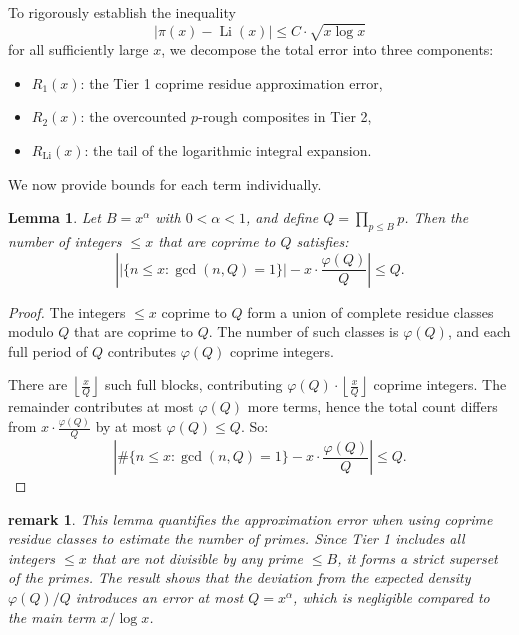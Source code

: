 \documentclass[11pt]{article}
\newtheorem{lemma}{Lemma}
\newtheorem{remark}{remark}
\begin{document}
	To rigorously establish the inequality
	\[
	\left| \pi(x) - \operatorname{Li}(x) \right| \leq C \cdot \sqrt{x \log x}
	\]
	for all sufficiently large \( x \), we decompose the total error into three components:
	
	\begin{itemize}
		\item \( R_1(x) \): the Tier 1 coprime residue approximation error,
		\item \( R_2(x) \): the overcounted \( p \)-rough composites in Tier 2,
		\item \( R_{\operatorname{Li}}(x) \): the tail of the logarithmic integral expansion.
	\end{itemize}
	
	We now provide bounds for each term individually.
	
	\begin{lemma}
		Let \( B = x^\alpha \) with \( 0 < \alpha < 1 \), and define \( Q = \prod_{p \leq B} p \). Then the number of integers \( \leq x \) that are coprime to \( Q \) satisfies:
		\[
		\left| \left| \{ n \le x : \gcd(n, Q) = 1 \} \right| - x \cdot \frac{\varphi(Q)}{Q} \right| \le Q.
		\]
	\end{lemma}
	
	\begin{proof}
		The integers \( \le x \) coprime to \( Q \) form a union of complete residue classes modulo \( Q \) that are coprime to \( Q \). The number of such classes is \( \varphi(Q) \), and each full period of \( Q \) contributes \( \varphi(Q) \) coprime integers.
		
		There are \( \left\lfloor \frac{x}{Q} \right\rfloor \) such full blocks, contributing \( \varphi(Q) \cdot \left\lfloor \frac{x}{Q} \right\rfloor \) coprime integers. The remainder contributes at most \( \varphi(Q) \) more terms, hence the total count differs from \( x \cdot \frac{\varphi(Q)}{Q} \) by at most \( \varphi(Q) \le Q \). So:
		\[
		\left| \#\{ n \le x : \gcd(n, Q) = 1 \} - x \cdot \frac{\varphi(Q)}{Q} \right| \le Q.
		\]
	\end{proof}
	
	\begin{remark}
		This lemma quantifies the approximation error when using coprime residue classes to estimate the number of primes. Since Tier 1 includes all integers \( \le x \) that are not divisible by any prime \( \le B \), it forms a strict superset of the primes. The result shows that the deviation from the expected density \( \varphi(Q)/Q \) introduces an error at most \( Q = x^\alpha \), which is negligible compared to the main term \( x / \log x \).
	\end{remark}
	
\end{document}
